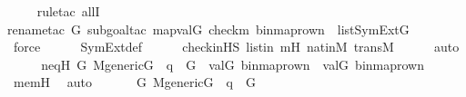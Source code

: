 \begin{isabellebody}
\ \ \ \ \isamarkupfalse%
{\isacharparenleft}{\kern0pt}rule{\isacharunderscore}{\kern0pt}tac\ allI{\isacharparenright}{\kern0pt}\isanewline
\ \ \ \ \isamarkupfalse%
{\isacharparenleft}{\kern0pt}rename{\isacharunderscore}{\kern0pt}tac\ G{\isacharcomma}{\kern0pt}\ subgoal{\isacharunderscore}{\kern0pt}tac\ {\isachardoublequoteopen}map{\isacharparenleft}{\kern0pt}val{\isacharparenleft}{\kern0pt}G{\isacharparenright}{\kern0pt}{\isacharcomma}{\kern0pt}\ {\isacharbrackleft}{\kern0pt}check{\isacharparenleft}{\kern0pt}m{\isacharparenright}{\kern0pt}{\isacharcomma}{\kern0pt}\ binmap{\isacharunderscore}{\kern0pt}row{\isacharprime}{\kern0pt}{\isacharparenleft}{\kern0pt}n{\isacharprime}{\kern0pt}{\isacharparenright}{\kern0pt}{\isacharbrackright}{\kern0pt}{\isacharparenright}{\kern0pt}\ {\isasymin}\ list{\isacharparenleft}{\kern0pt}SymExt{\isacharparenleft}{\kern0pt}G{\isacharparenright}{\kern0pt}{\isacharparenright}{\kern0pt}{\isachardoublequoteclose}{\isacharparenright}{\kern0pt}\isanewline
\ \ \ \ \ \isamarkupfalse%
\ force\isanewline
\ \ \ \ \isamarkupfalse%
\ SymExt{\isacharunderscore}{\kern0pt}def\isanewline
\ \ \ \ \isamarkupfalse%
\ check{\isacharunderscore}{\kern0pt}in{\isacharunderscore}{\kern0pt}HS\ listin\ mH\ nat{\isacharunderscore}{\kern0pt}in{\isacharunderscore}{\kern0pt}M\ transM\isanewline
\ \ \ \ \isamarkupfalse%
\ auto\isanewline
\ \ \isamarkupfalse%
\ \isamarkupfalse%
\ neqH{\isacharcolon}{\kern0pt}\ {\isachardoublequoteopen}{\isasymforall}G{\isachardot}{\kern0pt}\ M{\isacharunderscore}{\kern0pt}generic{\isacharparenleft}{\kern0pt}G{\isacharparenright}{\kern0pt}\ {\isasymand}\ q\ {\isasymin}\ G\ {\isasymlongrightarrow}\ val{\isacharparenleft}{\kern0pt}G{\isacharcomma}{\kern0pt}\ binmap{\isacharunderscore}{\kern0pt}row{\isacharprime}{\kern0pt}{\isacharparenleft}{\kern0pt}n{\isacharparenright}{\kern0pt}{\isacharparenright}{\kern0pt}\ {\isasymnoteq}\ val{\isacharparenleft}{\kern0pt}G{\isacharcomma}{\kern0pt}\ binmap{\isacharunderscore}{\kern0pt}row{\isacharprime}{\kern0pt}{\isacharparenleft}{\kern0pt}n{\isacharprime}{\kern0pt}{\isacharparenright}{\kern0pt}{\isacharparenright}{\kern0pt}{\isachardoublequoteclose}\isanewline
\ \ \ \ \isamarkupfalse%
\ memH\ \isamarkupfalse%
\ auto\isanewline
\ \ \isanewline
\ \ \isamarkupfalse%
\ {\isachardoublequoteopen}{\isasymexists}G{\isachardot}{\kern0pt}\ M{\isacharunderscore}{\kern0pt}generic{\isacharparenleft}{\kern0pt}G{\isacharparenright}{\kern0pt}\ {\isasymand}\ q\ {\isasymin}\ G{\isachardoublequoteclose}\ \isanewline

\end{isabellebody}
